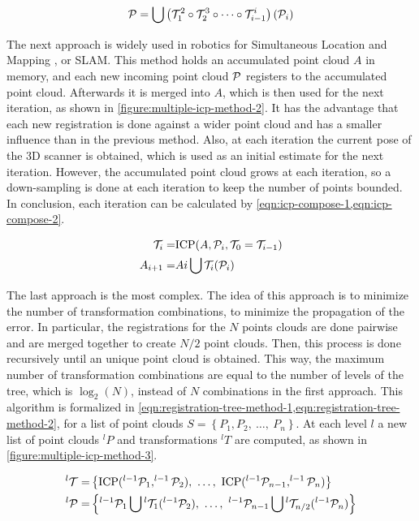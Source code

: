 \begin{equation}
\label{eqn:registration-simple-method-calculation}
    \mathcal{P} = \bigcup{\left(\mathcal{T}_1^2 \circ \mathcal{T}_2^3 \circ \dots \circ \mathcal{T}_{i-1}^i\right)(\mathcal{P}_i)}
\end{equation}

The next approach is widely used in robotics for Simultaneous Location and Mapping , or SLAM. This method holds an accumulated point cloud $A$ in memory, and each new incoming point cloud $\mathcal{P}$ registers to the accumulated point cloud.  Afterwards it is merged into $A$, which is then used for the next iteration, as shown in \cref{figure:multiple-icp-method-2}. It has the advantage that each new registration is done against a wider point cloud and has a smaller influence than in the previous method. Also, at each iteration the current pose of the 3D scanner is obtained, which is used as an initial estimate for the next iteration. However, the accumulated point cloud grows at each iteration, so a down-sampling is done at each iteration to keep the number of points bounded. In conclusion, each iteration can be calculated by \cref{eqn:icp-compose-1,eqn:icp-compose-2}.

\begin{align}
    \label{eqn:icp-compose-1}
    \mathcal{T}_{i} = & \textrm{ICP}(A, \mathcal{P}_{i}, \mathcal{T}_0 = \mathcal{T}_{i-1}) \\
    \label{eqn:icp-compose-2}
    A_{i+1} = & A{i} \bigcup \mathcal{T}_{i}(\mathcal{P}_i)
\end{align}

The last approach is the most complex. The idea of this approach is to minimize the number of transformation combinations, to minimize the propagation of the error. In particular, the registrations for the $N$ points clouds are done pairwise and are merged together to create $N/2$ point clouds. Then, this process is done recursively until an unique point cloud is obtained. This way, the maximum number of transformation combinations are equal to the number of levels of the tree, which is $\log_2(N)$, instead of $N$ combinations in the first approach. This algorithm is formalized in \cref{eqn:registration-tree-method-1,eqn:registration-tree-method-2}, for a list of point clouds $S=\left\{P_1, P_2, \ \dots, \ P_n\right\}$. At each level $l$ a new list of point clouds $^{l}P$ and transformations $^{l}T$ are computed, as shown in \cref{figure:multiple-icp-method-3}.

\begin{align}
    ^{l}\T = & \left\{\textrm{ICP}(^{l-1}\Pt_1, ^{l-1}\Pt_2), \ \dots, \ \textrm{ICP}(^{l-1}\Pt_{n-1}, ^{l-1}\Pt_{n}) \right\}
        \label{eqn:registration-tree-method-1} \\
    ^{l}\Pt = & \left\{^{l-1}\Pt_1 \bigcup{^{l}\T_1(^{l-1}\Pt_2}), \ \dots, \ ^{l-1}\Pt_{n-1} \bigcup{^{l}\T_{n/2}(^{l-1}\Pt_n)}\right\}
        \label{eqn:registration-tree-method-2}
\end{align}

